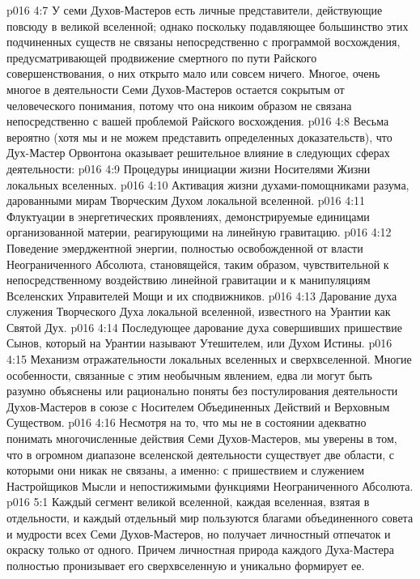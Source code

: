 \vs p016 4:7 У семи Духов\hyp{}Мастеров есть личные представители, действующие повсюду в великой вселенной; однако поскольку подавляющее большинство этих подчиненных существ не связаны непосредственно с программой восхождения, предусматривающей продвижение смертного по пути Райского совершенствования, о них открыто мало или совсем ничего. Многое, очень многое в деятельности Семи Духов\hyp{}Мастеров остается сокрытым от человеческого понимания, потому что она никоим образом не связана непосредственно с вашей проблемой Райского восхождения.
\vs p016 4:8 \pc Весьма вероятно (хотя мы и не можем представить определенных доказательств), что Дух\hyp{}Мастер Орвонтона оказывает решительное влияние в следующих сферах деятельности:
\vs p016 4:9 \bibnobreakspace Процедуры инициации жизни Носителями Жизни локальных вселенных.
\vs p016 4:10 \bibnobreakspace Активация жизни духами\hyp{}помощниками разума, дарованными мирам Творческим Духом локальной вселенной.
\vs p016 4:11 \bibnobreakspace Флуктуации в энергетических проявлениях, демонстрируемые единицами организованной материи, реагирующими на линейную гравитацию.
\vs p016 4:12 \bibnobreakspace Поведение эмерджентной энергии, полностью освобожденной от власти Неограниченного Абсолюта, становящейся, таким образом, чувствительной к непосредственному воздействию линейной гравитации и к манипуляциям Вселенских Управителей Мощи и их сподвижников.
\vs p016 4:13 \bibnobreakspace Дарование духа служения Творческого Духа локальной вселенной, известного на Урантии как Святой Дух.
\vs p016 4:14 \bibnobreakspace Последующее дарование духа совершивших пришествие Сынов, который на Урантии называют Утешителем, или Духом Истины.
\vs p016 4:15 \bibnobreakspace Механизм отражательности локальных вселенных и сверхвселенной. Многие особенности, связанные с этим необычным явлением, едва ли могут быть разумно объяснены или рационально поняты без постулирования деятельности Духов\hyp{}Мастеров в союзе с Носителем Объединенных Действий и Верховным Существом.
\vs p016 4:16 \pc Несмотря на то, что мы не в состоянии адекватно понимать многочисленные действия Семи Духов\hyp{}Мастеров, мы уверены в том, что в огромном диапазоне вселенской деятельности существует две области, с которыми они никак не связаны, а именно: с пришествием и служением Настройщиков Мысли и непостижимыми функциями Неограниченного Абсолюта.
\vs p016 5:1 Каждый сегмент великой вселенной, каждая вселенная, взятая в отдельности, и каждый отдельный мир пользуются благами объединенного совета и мудрости всех Семи Духов\hyp{}Мастеров, но получает личностный отпечаток и окраску только от одного. Причем личностная природа каждого Духа\hyp{}Мастера полностью пронизывает его сверхвселенную и уникально формирует ее.
